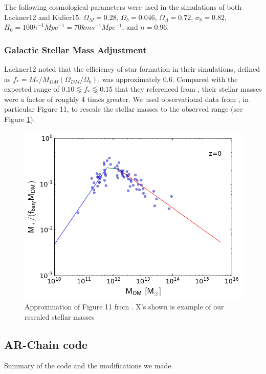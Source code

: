 \documentclass[english, apj]{emulateapj}
\begin{document}
The following cosmological parameters were used in the simulations of both Lackner12 and Kulier15:   $\Omega_M = 0.28$, $\Omega_b = 0.046$, $\Omega_\Lambda = 0.72$, $\sigma_8 = 0.82$, $H_0 = 100h^{-1}Mpc^{-1} = 70 km s^{-1} Mpc^{-1}$, and $n = 0.96$.

\subsubsection{Galactic Stellar Mass Adjustment}
Lackner12 noted that the efficiency of star formation in their simulations, defined as $f_*=M_*/M_{DM}(\Omega_{DM}/\Omega_b)$, was approximately 0.6.  Compared with the expected range of $0.10 \lessapprox f_* \lessapprox 0.15$ that they referenced from \citet{2012ApJ...746...95L}, their stellar masses were a factor of roughly 4 times greater.  We used observational data from \citet{2018AstL...44....8K}, in particular Figure 11, to rescale the stellar masses to the observed range (see Figure \ref{fig:stellar1}).
\begin{figure}[h!]
\begin{center}
\includegraphics[width=1.0\columnwidth]{plots/stellar_to_halo_ratio.png}
\caption{Approximation of Figure 11 from \citet{2018AstL...44....8K}.  X's shown is example of our rescaled stellar masses}
\label{fig:stellar1}
\end{center}
\end{figure}

\subsection{AR-Chain code}
Summary of the code and the modifications we made.
\end{document}
